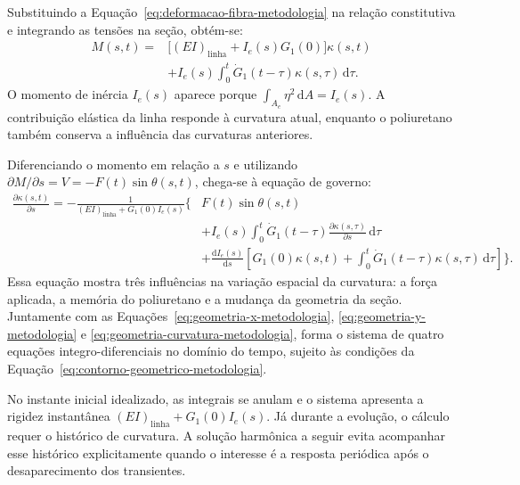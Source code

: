 \documentclass[arial,centeredequations,english,brazilian,oneside,section=TITLE]{ifes8}
\begin{document}
Substituindo a Equação~\eqref{eq:deformacao-fibra-metodologia} na relação
constitutiva e integrando as tensões na seção, obtém-se:
\begin{equation}
  \begin{aligned}
    M(s,t)={}&\bigl[(EI)_{\mathrm{linha}}+I_e(s)G_1(0)\bigr]\kappa(s,t)\\
      &+I_e(s)\int_0^t
        \dot G_1(t-\tau)\kappa(s,\tau)\,\mathrm{d}\tau.
  \end{aligned}
  \label{eq:momento-curvatura-linear-tempo}
\end{equation}
O momento de inércia $I_e(s)$ aparece porque
$\int_{A_e}\eta^2\,\mathrm{d}A=I_e(s)$. A contribuição elástica da linha
responde à curvatura atual, enquanto o poliuretano também conserva a influência
das curvaturas anteriores.

Diferenciando o momento em relação a $s$ e utilizando
$\partial M/\partial s=V=-F(t)\sin\theta(s,t)$, chega-se à equação de governo:
\begin{equation}
  \begin{aligned}
    \frac{\partial\kappa(s,t)}{\partial s}
    =-\frac{1}{(EI)_{\mathrm{linha}}+G_1(0)I_e(s)}
    \Biggl\{&F(t)\sin\theta(s,t)\\
      &+I_e(s)\int_0^t \dot G_1(t-\tau)
        \frac{\partial\kappa(s,\tau)}{\partial s}\,\mathrm{d}\tau\\
      &+\frac{\mathrm{d}I_e(s)}{\mathrm{d}s}
        \left[G_1(0)\kappa(s,t)
        +\int_0^t\dot G_1(t-\tau)\kappa(s,\tau)\,\mathrm{d}\tau\right]
    \Biggr\}.
  \end{aligned}
  \label{eq:governo-curvatura-linear-tempo}
\end{equation}
Essa equação mostra três influências na variação espacial da curvatura:
a força aplicada, a memória do poliuretano e a mudança da geometria da seção.
Juntamente com as Equações~\eqref{eq:geometria-x-metodologia},
\eqref{eq:geometria-y-metodologia} e
\eqref{eq:geometria-curvatura-metodologia}, forma o sistema de quatro equações
integro-diferenciais no domínio do tempo, sujeito às condições da
Equação~\eqref{eq:contorno-geometrico-metodologia}.

No instante inicial idealizado, as integrais se anulam e o sistema apresenta a
rigidez instantânea $(EI)_{\mathrm{linha}}+G_1(0)I_e(s)$. Já durante a evolução,
o cálculo requer o histórico de curvatura. A solução harmônica a seguir evita
acompanhar esse histórico explicitamente quando o interesse é a resposta
periódica após o desaparecimento dos transientes.
\end{document}
